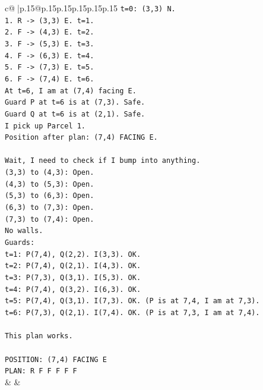 \documentclass{article}
\begin{document}
{\begin{supertabular}{c@{$\;$}|p{.15\linewidth}@{}p{.15\linewidth}p{.15\linewidth}p{.15\linewidth}p{.15\linewidth}p{.15\linewidth}}
{{{\texttt{t=0: (3,3) N.} \\
\texttt{1. R {-}> (3,3) E. t=1.} \\
\texttt{2. F {-}> (4,3) E. t=2.} \\
\texttt{3. F {-}> (5,3) E. t=3.} \\
\texttt{4. F {-}> (6,3) E. t=4.} \\
\texttt{5. F {-}> (7,3) E. t=5.} \\
\texttt{6. F {-}> (7,4) E. t=6.} \\
\texttt{At t=6, I am at (7,4) facing E.} \\
\texttt{Guard P at t=6 is at (7,3). Safe.} \\
\texttt{Guard Q at t=6 is at (2,1). Safe.} \\
\texttt{I pick up Parcel 1.} \\
\texttt{Position after plan: (7,4) FACING E.} \\
\\ 
\texttt{Wait, I need to check if I bump into anything.} \\
\texttt{(3,3) to (4,3): Open.} \\
\texttt{(4,3) to (5,3): Open.} \\
\texttt{(5,3) to (6,3): Open.} \\
\texttt{(6,3) to (7,3): Open.} \\
\texttt{(7,3) to (7,4): Open.} \\
\texttt{No walls.} \\
\texttt{Guards:} \\
\texttt{t=1: P(7,4), Q(2,2). I(3,3). OK.} \\
\texttt{t=2: P(7,4), Q(2,1). I(4,3). OK.} \\
\texttt{t=3: P(7,3), Q(3,1). I(5,3). OK.} \\
\texttt{t=4: P(7,4), Q(3,2). I(6,3). OK.} \\
\texttt{t=5: P(7,4), Q(3,1). I(7,3). OK. (P is at 7,4, I am at 7,3).} \\
\texttt{t=6: P(7,3), Q(2,1). I(7,4). OK. (P is at 7,3, I am at 7,4).} \\
\\ 
\texttt{This plan works.} \\
\\ 
\texttt{POSITION: (7,4) FACING E} \\
\texttt{PLAN: R F F F F F} \\
            }
        }
    }
    & & \\ \\


\end{supertabular}}
\end{document}
